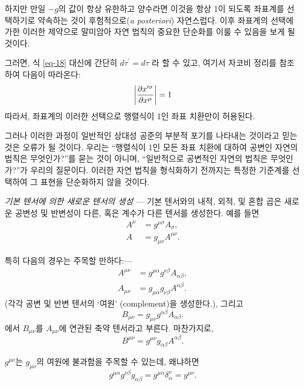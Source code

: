 하지만 만일 $-g$의 값이 항상 유한하고 양수라면 이것을 항상 1이 되도록 좌표계를 선택하기로 약속하는 것이 후험적으로(\emph{a posteriori}) 자연스럽다. 이후 좌표계의 선택에 가한 이러한 제약으로 말미암아 자연 법칙의 중요한 단순화를 이룰 수 있음을 보게 될 것이다.

그러면, 식 \eqref{eq-18} 대신에 간단히 $d\tau^\prime = d\tau$ 라 할 수 있고, 여기서 자코비 정리를 참조하여 다음이 따라온다:
\begin{equation} \label{eq-19}
	\left|{\frac{{\partial}{x^{\prime\sigma}}}{{\partial}{x^\mu}}}\right|=1
\end{equation}  
따라서, 좌표계의 이러한 선택으로 행렬식이 1인 좌표 치환만이 허용된다.

그러나 이러한 과정이 일반적인 상대성 공준의 부분적 포기를 나타내는 것이라고 믿는 것은 오류가 될 것이다. 우리는 ``행렬식이 1인 모든 좌표 치환에 대하여 공변인 자연의 법칙은 무엇인가?''를 묻는 것이 아니며, ``일반적으로 공변적인 자연의 법칙은 무엇인가?''가 우리의 질문이다. 이러한 자연 법칙을 형식화하기 전까지는 특정한 기준계를 선택하여 그 표현을 단순화하지 않을 것이다. 

\emph{기본 텐서에 의한 새로운 텐서의 생성} ---
기본 텐서와의 내적, 외적, 및 혼합 곱은 새로운 공변성 및 반변성이 다른, 혹은 계수가 다른 텐서를 생성한다. 예를 들면
\begin{align*}
	A^\mu &= g^{\mu\sigma} A_\sigma, \\
	A &= g_{\mu\nu} A^{\mu\nu}.
\end{align*}

특히 다음의 경우는 주목할 만하다:---
\begin{align*}
	A^{\mu\nu} &= g^{\mu\alpha} g^{\nu\beta} A_{\alpha\beta}, \\
	A_{\mu\nu} &= g_{\mu\alpha} g_{\nu\beta} A^{\alpha\beta}.
\end{align*}
(각각 공변 및 반변 텐서의 `여원' (complement)을 생성한다.), 그리고
\begin{equation*}
	B_{\mu\nu} = g_{\mu\nu} g^{\alpha\beta} A_{\alpha\beta}.
\end{equation*}
에서 $B_{\mu\nu}$를 $A_{\mu\nu}$에 연관된 축약 텐서라고 부른다. 마찬가지로,
\begin{equation*}
	B^{\mu\nu} = g^{\mu\nu} g_{\alpha\beta} A^{\alpha\beta}.
\end{equation*}

$g^{\mu\nu}$는 $g_{\mu\nu}$의 여원에 불과함을 주목할 수 있는데, 왜냐하면
\begin{equation*}
	g^{\mu\alpha} g^{\nu\beta} g_{\alpha\beta}=g^{\mu\alpha}\delta_\alpha^\nu = g^{\mu\nu}.
\end{equation*}

